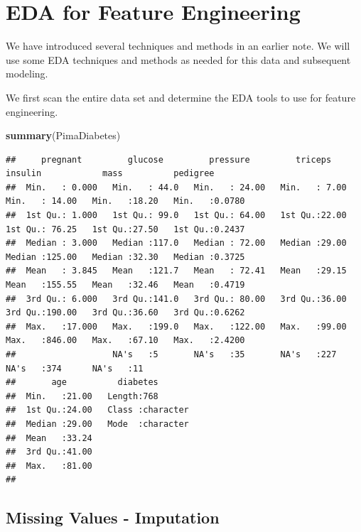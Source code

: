 \documentclass[
]{book}
\newenvironment{Shaded}{\begin{snugshade}}{\end{snugshade}}
\newcommand{\FunctionTok}[1]{\textcolor[rgb]{0.13,0.29,0.53}{\textbf{#1}}}
\newcommand{\NormalTok}[1]{#1}
\begin{document}
\hfill\break

\hypertarget{eda-for-feature-engineering-1}{%
\section{EDA for Feature Engineering}\label{eda-for-feature-engineering-1}}

We have introduced several techniques and methods in an earlier note. We will use some EDA techniques and methods as needed for this data and subsequent modeling.

We first scan the entire data set and determine the EDA tools to use for feature engineering.

\begin{Shaded}
\begin{Highlighting}[]
\FunctionTok{summary}\NormalTok{(PimaDiabetes)}
\end{Highlighting}
\end{Shaded}

\begin{verbatim}
##     pregnant         glucose         pressure         triceps         insulin            mass          pedigree     
##  Min.   : 0.000   Min.   : 44.0   Min.   : 24.00   Min.   : 7.00   Min.   : 14.00   Min.   :18.20   Min.   :0.0780  
##  1st Qu.: 1.000   1st Qu.: 99.0   1st Qu.: 64.00   1st Qu.:22.00   1st Qu.: 76.25   1st Qu.:27.50   1st Qu.:0.2437  
##  Median : 3.000   Median :117.0   Median : 72.00   Median :29.00   Median :125.00   Median :32.30   Median :0.3725  
##  Mean   : 3.845   Mean   :121.7   Mean   : 72.41   Mean   :29.15   Mean   :155.55   Mean   :32.46   Mean   :0.4719  
##  3rd Qu.: 6.000   3rd Qu.:141.0   3rd Qu.: 80.00   3rd Qu.:36.00   3rd Qu.:190.00   3rd Qu.:36.60   3rd Qu.:0.6262  
##  Max.   :17.000   Max.   :199.0   Max.   :122.00   Max.   :99.00   Max.   :846.00   Max.   :67.10   Max.   :2.4200  
##                   NA's   :5       NA's   :35       NA's   :227     NA's   :374      NA's   :11                      
##       age          diabetes        
##  Min.   :21.00   Length:768        
##  1st Qu.:24.00   Class :character  
##  Median :29.00   Mode  :character  
##  Mean   :33.24                     
##  3rd Qu.:41.00                     
##  Max.   :81.00                     
## 
\end{verbatim}

\hypertarget{missing-values---imputation}{%
\subsection{Missing Values - Imputation}\label{missing-values---imputation}}
\end{document}
